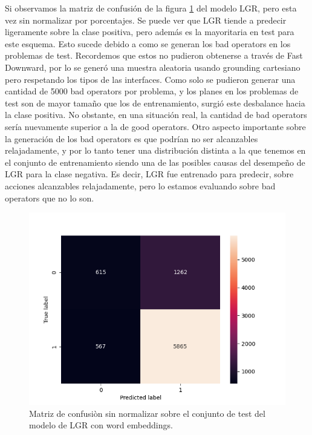 Si observamos la matriz de confusión de la figura
\ref{fig:takeimage-bestmodel-cm-raw-test} del modelo LGR, pero esta vez sin
normalizar por porcentajes. Se puede ver que LGR tiende a predecir ligeramente
sobre la clase positiva, pero además es la mayoritaria en test para este
esquema. Esto sucede debido a como se generan los bad operators en los problemas
de test. Recordemos que estos no pudieron obtenerse a través de Fast Downward,
por lo se generó una muestra aleatoria usando grounding cartesiano pero
respetando los tipos de las interfaces. Como solo se pudieron generar una
cantidad de 5000 bad operators por problema, y los planes en los problemas de
test son de mayor tamaño que los de entrenamiento, surgió este desbalance hacia
la clase positiva. No obstante, en una situación real, la cantidad de bad
operators sería nuevamente superior a la de good operators. Otro aspecto
importante sobre la generación de los bad operators es que podrían no ser
alcanzables relajadamente, y por lo tanto tener una distribución distinta a la
que tenemos en el conjunto de entrenamiento siendo una de las posibles causas
del desempeño de LGR para la clase negativa. Es decir, LGR fue entrenado para
predecir, sobre acciones alcanzables relajadamente, pero lo estamos evaluando
sobre bad operators que no lo son.

\begin{figure}[b!]
    \centering
    \includegraphics[width=\linewidth]{figures/results/word_embeddings/lgr/take_image/lgr_set_6_confusion_matrix_raw.png}
    \caption{Matriz de confusiòn sin normalizar sobre el conjunto de test del modelo de LGR con word embeddings.}
    \label{fig:takeimage-bestmodel-cm-raw-test}
\end{figure}

